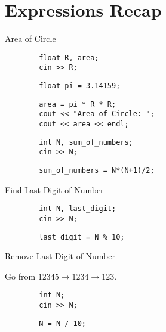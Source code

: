 \section{Expressions Recap}

\begin{frame}[fragile]{Area of Circle}{}
    \huge
    \begin{verbatim}
        float R, area;
        cin >> R;
    \end{verbatim}
    \pause
    \begin{verbatim}
        float pi = 3.14159;
    \end{verbatim}
    \pause
    \begin{verbatim}
        area = pi * R * R;
        cout << "Area of Circle: ";
        cout << area << endl;
    \end{verbatim}
\end{frame}

\begin{frame}[fragile]{}{}
    \LARGE
    \begin{verbatim}
        int N, sum_of_numbers;
        cin >> N;
    \end{verbatim}
    \pause
    \begin{verbatim}
        sum_of_numbers = N*(N+1)/2;
    \end{verbatim}
\end{frame}

\begin{frame}[fragile]{Find Last Digit of Number}{}
    \huge
    \begin{verbatim}
        int N, last_digit;
        cin >> N;
    \end{verbatim}
    \pause
    \begin{verbatim}
        last_digit = N % 10;
    \end{verbatim}
\end{frame}

\begin{frame}[fragile]{Remove Last Digit of Number}{}
    \huge
    \begin{block}{}
        Go from $12345\longrightarrow 1234\longrightarrow 123$.
    \end{block}
    \begin{verbatim}
        int N;
        cin >> N;
    \end{verbatim}
    \pause
    \begin{verbatim}
        N = N / 10;
    \end{verbatim}
\end{frame}
